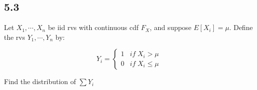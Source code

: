 \subsection*{5.3}

Let $X_1, \cdots, X_n$ be iid rvs with continuous cdf $F_X$, and suppose $E[X_i] = \mu$. Define the rvs $Y_1, \cdots, Y_n$ by:

\[
Y_i =
\begin{cases}
	1 & if \; X_i > \mu \\
	0 & if \; X_i \leq \mu
\end{cases}
\]

Find the distribution of $\sum Y_i$
